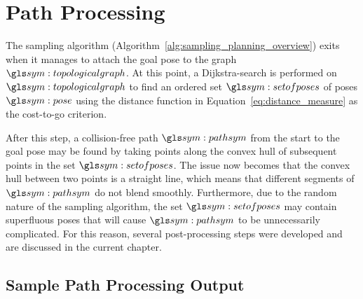 \chapter{Path Processing}%
\label{chap:path_processing}

	The sampling algorithm (Algorithm~\ref{alg:sampling_planning_overview})
	exits when it manages to attach the goal pose to the graph
	$\topologicalgraph$. At this point, a Dijkstra-search is performed on
	$\topologicalgraph$ to find an ordered set $\setofposes$ of poses $\pose$
	using the distance function in Equation~\ref{eq:distance_measure} as the
	cost-to-go criterion.

	After this step, a collision-free path $\pathsym$ from the start to the goal
	pose may be found by taking points along the convex hull of subsequent
	points in the set $\setofposes$. The issue now becomes that the convex hull
	between two points is a straight line, which means that different segments
	of $\pathsym$ do not blend smoothly. Furthermore, due to the random nature
	of the sampling algorithm, the set $\setofposes$ may contain superfluous
	poses that will cause $\pathsym$ to be unnecessarily complicated. For this
	reason, several post-processing steps were developed and are discussed in
	the current chapter.

	
	

	\section{Sample Path Processing Output}%
	\label{sec:sample_path_processing_output}
